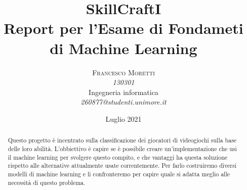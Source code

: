 \documentclass[12pt,a4paper]{article}
\begin{document}
\title{SkillCraftI\\
\Large{Report per l'Esame di Fondameti di Machine Learning}
}%
\author{\textsc{Francesco Moretti} \\
    \emph{130301} \\
    Ingegneria informatica\\
    \emph{260877@studenti.unimore.it}
  }
\date{Luglio 2021}
\maketitle
\clearpage

\begin{abstract}
\normalsize
Questo progetto è incentrato sulla classificazione dei giocatori di videogiochi sulla base delle loro abilità. L’obbiettivo è capire se è possibile creare un’implementazione che usi il machine learning per svolgere questo compito, e che vantaggi ha questa soluzione rispetto alle alternative attualmente usate correntemente. Per farlo costruiremo diversi modelli di machine learning e li confronteremo per capire quale si adatta meglio alle necessità di questo problema.


\end{abstract}
\clearpage


\tableofcontents{}
\clearpage








\clearpage
{}

\end{document}
